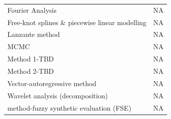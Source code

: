 \documentclass[12pt,twoside,openany]{reedthesis}
\begin{document}
\begin{longtable}[]{@{}lc@{}}
\begin{minipage}[t]{0.43\columnwidth}\raggedright
Fourier Analysis\strut
\end{minipage} & \begin{minipage}[t]{0.35\columnwidth}\centering
NA\strut
\end{minipage}\tabularnewline
\begin{minipage}[t]{0.43\columnwidth}\raggedright
Free-knot splines \& piecewise
linear modelling\strut
\end{minipage} & \begin{minipage}[t]{0.35\columnwidth}\centering
NA\strut
\end{minipage}\tabularnewline
\begin{minipage}[t]{0.43\columnwidth}\raggedright
Lanzante method\strut
\end{minipage} & \begin{minipage}[t]{0.35\columnwidth}\centering
NA\strut
\end{minipage}\tabularnewline
\begin{minipage}[t]{0.43\columnwidth}\raggedright
MCMC\strut
\end{minipage} & \begin{minipage}[t]{0.35\columnwidth}\centering
NA\strut
\end{minipage}\tabularnewline
\begin{minipage}[t]{0.43\columnwidth}\raggedright
Method 1-TBD\strut
\end{minipage} & \begin{minipage}[t]{0.35\columnwidth}\centering
NA\strut
\end{minipage}\tabularnewline
\begin{minipage}[t]{0.43\columnwidth}\raggedright
Method 2-TBD\strut
\end{minipage} & \begin{minipage}[t]{0.35\columnwidth}\centering
NA\strut
\end{minipage}\tabularnewline
\begin{minipage}[t]{0.43\columnwidth}\raggedright
Vector-autoregressive method\strut
\end{minipage} & \begin{minipage}[t]{0.35\columnwidth}\centering
NA\strut
\end{minipage}\tabularnewline
\begin{minipage}[t]{0.43\columnwidth}\raggedright
Wavelet analysis
(decomposition)\strut
\end{minipage} & \begin{minipage}[t]{0.35\columnwidth}\centering
NA\strut
\end{minipage}\tabularnewline
\begin{minipage}[t]{0.43\columnwidth}\raggedright
method-fuzzy synthetic
evaluation (FSE)\strut
\end{minipage} & \begin{minipage}[t]{0.35\columnwidth}\centering
NA\strut
\end{minipage}\tabularnewline
\bottomrule
\end{longtable}
\end{document}
